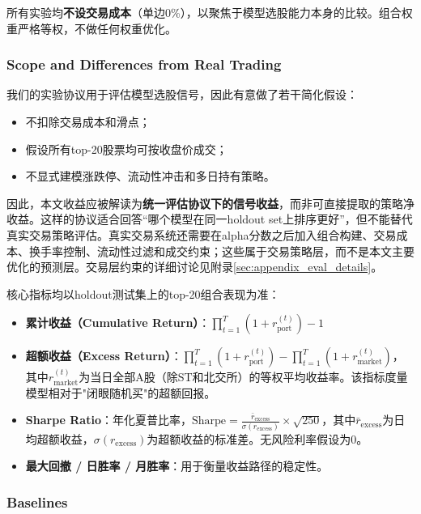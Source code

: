所有实验均\textbf{不设交易成本}（单边0\%），以聚焦于模型选股能力本身的比较。组合权重严格等权，不做任何权重优化。

\subsubsection{Scope and Differences from Real Trading}

我们的实验协议用于评估模型选股信号，因此有意做了若干简化假设：

\begin{itemize}[leftmargin=*, itemsep=2pt]
    \item 不扣除交易成本和滑点；
    \item 假设所有top-20股票均可按收盘价成交；
    \item 不显式建模涨跌停、流动性冲击和多日持有策略。
\end{itemize}

因此，本文收益应被解读为\textbf{统一评估协议下的信号收益}，而非可直接提取的策略净收益。这样的协议适合回答“哪个模型在同一holdout set上排序更好”，但不能替代真实交易策略评估。真实交易系统还需要在alpha分数之后加入组合构建、交易成本、换手率控制、流动性过滤和成交约束；这些属于交易策略层，而不是本文主要优化的预测层。交易层约束的详细讨论见附录\ref{sec:appendix_eval_details}。

核心指标均以holdout测试集上的top-20组合表现为准：

\begin{itemize}[leftmargin=*, itemsep=2pt]
    \item \textbf{累计收益（Cumulative Return）}：$\prod_{t=1}^{T} (1 + r_{\text{port}}^{(t)}) - 1$
    \item \textbf{超额收益（Excess Return）}：$\prod_{t=1}^{T} (1 + r_{\text{port}}^{(t)}) - \prod_{t=1}^{T} (1 + r_{\text{market}}^{(t)})$，其中$r_{\text{market}}^{(t)}$为当日全部A股（除ST和北交所）的等权平均收益率。该指标度量模型相对于"闭眼随机买"的超额回报。
    \item \textbf{Sharpe Ratio}：年化夏普比率，$\text{Sharpe} = \frac{\bar{r}_{\text{excess}}}{\sigma(r_{\text{excess}})} \times \sqrt{250}$，其中$\bar{r}_{\text{excess}}$为日均超额收益，$\sigma(r_{\text{excess}})$为超额收益的标准差。无风险利率假设为0。
    \item \textbf{最大回撤 / 日胜率 / 月胜率}：用于衡量收益路径的稳定性。
\end{itemize}

\subsubsection{Baselines}

